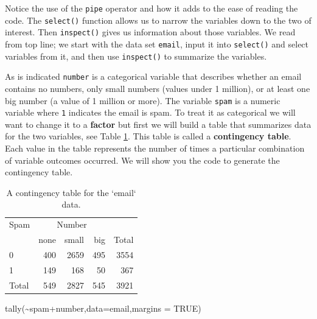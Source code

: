 \documentclass[
]{book}
\newenvironment{Shaded}{\begin{snugshade}}{\end{snugshade}}
\newcommand{\AttributeTok}[1]{\textcolor[rgb]{0.77,0.63,0.00}{#1}}
\newcommand{\ConstantTok}[1]{\textcolor[rgb]{0.00,0.00,0.00}{#1}}
\newcommand{\FunctionTok}[1]{\textcolor[rgb]{0.00,0.00,0.00}{#1}}
\newcommand{\NormalTok}[1]{#1}
\newcommand{\SpecialCharTok}[1]{\textcolor[rgb]{0.00,0.00,0.00}{#1}}
\begin{document}
Notice the use of the \texttt{pipe} operator and how it adds to the ease of reading the code. The \texttt{select()} function allows us to narrow the variables down to the two of interest. Then \texttt{inspect()} gives us information about those variables. We read from top line; we start with the data set \texttt{email}, input it into \texttt{select()} and select variables from it, and then use \texttt{inspect()} to summarize the variables.

As is indicated \texttt{number} is a categorical variable that describes whether an email contains no numbers, only small numbers (values under 1 million), or at least one big number (a value of 1 million or more). The variable \texttt{spam} is a numeric variable where \texttt{1} indicates the email is spam. To treat it as categorical we will want to change it to a \textbf{factor} but first we will build a table that summarizes data for the two variables, see Table \ref{tab:contin1-tab}. This table is called a \textbf{contingency table}. Each value in the table represents the number of times a particular combination of variable outcomes occurred. We will show you the code to generate the contingency table.

\begin{table}

\caption{\label{tab:contin1-tab}A contingency table for the `email` data.}
\centering
\begin{tabular}[t]{lrrrr}
\toprule
\multicolumn{1}{c}{Spam} & \multicolumn{3}{c}{Number} & \multicolumn{1}{c}{ } \\
\cmidrule(l{3pt}r{3pt}){1-1} \cmidrule(l{3pt}r{3pt}){2-4}
  & none & small & big & Total\\
\midrule
0 & 400 & 2659 & 495 & 3554\\
1 & 149 & 168 & 50 & 367\\
Total & 549 & 2827 & 545 & 3921\\
\bottomrule
\end{tabular}
\end{table}

\begin{Shaded}
\begin{Highlighting}[]
\FunctionTok{tally}\NormalTok{(}\SpecialCharTok{\textasciitilde{}}\NormalTok{spam}\SpecialCharTok{+}\NormalTok{number,}\AttributeTok{data=}\NormalTok{email,}\AttributeTok{margins =} \ConstantTok{TRUE}\NormalTok{)}
\end{Highlighting}
\end{Shaded}
\end{document}
